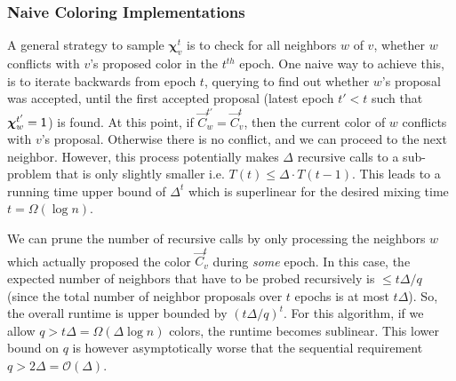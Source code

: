 \subsubsection{Naive Coloring Implementations}%
\label{sec:naive_coloring_implementations}
A general strategy to sample $\bm\chi^t_v$ is to check for all neighbors $w$ of $v$,
whether $w$ conflicts with $v$'s proposed color in the $t^{th}$ epoch.
One naive way to achieve this, is to iterate backwards from epoch $t$, querying to find out whether $w$'s proposal was accepted,
until the first accepted proposal (latest epoch $t' < t$ such that $\bm\chi^{t'}_w=\mathsf{1}$) is found.
At this point, if $\vec C^{t'}_w =\vec C^t_v$, then the current color of $w$ conflicts with $v$'s proposal.
Otherwise there is no conflict, and we can proceed to the next neighbor.
However, this process potentially makes $\Delta$ recursive calls to a sub-problem that is only slightly smaller i.e. $T(t) \le \Delta\cdot T(t-1)$.
This leads to a running time upper bound of $\Delta^{t}$ which is superlinear for the desired mixing time $t = \Omega(\log n)$.

We can prune the number of recursive calls by only processing the neighbors $w$ which actually proposed the color $\vec C^t_v$ during \emph{some} epoch.
In this case, the expected number of neighbors that have to be probed recursively is $\le t\Delta/q$
(since the total number of neighbor proposals over $t$ epochs is at most $t\Delta$).
So, the overall runtime is upper bounded by $(t\Delta/q)^{t}$.
For this algorithm, if we allow $q > t\Delta = \Omega(\Delta\log n)$ colors, the runtime becomes sublinear.
This lower bound on $q$ is however asymptotically worse that the sequential requirement $q > 2\Delta = \mathcal O(\Delta)$.


